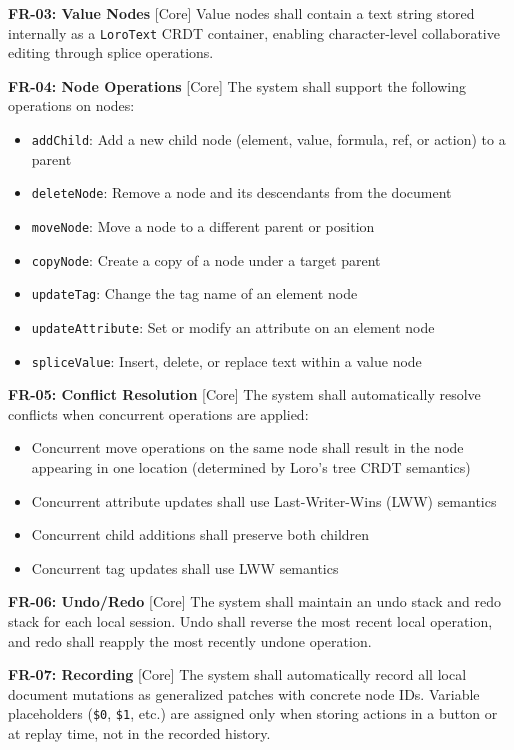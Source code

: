 \documentclass{article}
\begin{document}
\textbf{FR-03: Value Nodes} [Core] Value nodes shall contain a text string stored internally as a \texttt{LoroText} CRDT container, enabling character-level collaborative editing through splice operations.

\textbf{FR-04: Node Operations} [Core] The system shall support the following operations on nodes:
\begin{itemize}
\setlength{\itemsep}{-5pt}
\item \texttt{addChild}: Add a new child node (element, value, formula, ref, or action) to a parent
\item \texttt{deleteNode}: Remove a node and its descendants from the document
\item \texttt{moveNode}: Move a node to a different parent or position
\item \texttt{copyNode}: Create a copy of a node under a target parent
\item \texttt{updateTag}: Change the tag name of an element node
\item \texttt{updateAttribute}: Set or modify an attribute on an element node
\item \texttt{spliceValue}: Insert, delete, or replace text within a value node
\end{itemize}

\textbf{FR-05: Conflict Resolution} [Core] The system shall automatically resolve conflicts when concurrent operations are applied:
\begin{itemize}
\setlength{\itemsep}{-5pt}
\item Concurrent move operations on the same node shall result in the node appearing in one location (determined by Loro's tree CRDT semantics)
\item Concurrent attribute updates shall use Last-Writer-Wins (LWW) semantics
\item Concurrent child additions shall preserve both children
\item Concurrent tag updates shall use LWW semantics
\end{itemize}

\textbf{FR-06: Undo/Redo} [Core] The system shall maintain an undo stack and redo stack for each local session. Undo shall reverse the most recent local operation, and redo shall reapply the most recently undone operation.

\textbf{FR-07: Recording} [Core] The system shall automatically record all local document mutations as generalized patches with concrete node IDs. Variable placeholders (\texttt{\$0}, \texttt{\$1}, etc.) are assigned only when storing actions in a button or at replay time, not in the recorded history.
\end{document}
